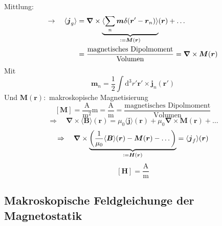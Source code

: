 \documentclass[titlepage,11pt,a4paper,ngerman]{report}
\newcommand*{\defeq}{\mathrel{\vcenter{\baselineskip0.5ex \lineskiplimit0pt \hbox{\scriptsize.}\hbox{\scriptsize.}}}=}
\newcommand{\tx}[1]{\textrm{#1}}
\newcommand{\ub}[1]{\underbrace{#1}}
\newcommand{\dd}{\tx{d}}
\renewcommand{\vec}[1]{\boldsymbol{#1}}
\newcommand{\vabla}{\boldsymbol{\nabla}}
\begin{document}
\\
Mittlung:
\begin{align*}
\rightarrow \quad \langle \vec{j}_g \rangle &= \vabla \times \ub{\langle \sum_n \vec{m} \delta(\vec{r}' - \vec{r}_n) \rangle}_{\defeq \vec{M}(\vec{r})} (\vec{r}) + \dots \\
&= \frac{\tx{magnetisches Dipolmoment}}{\tx{Volumen}} = \vabla \times \vec{M}(\vec{r})
\end{align*}
Mit
$$ \vec{m}_n = \frac{1}{2} \int \dd^3 r' \vec{r}' \times \vec{j}_n(\vec{r}') $$
Und $ \vec{M} (\vec{r}) : $ makroskopische Magnetisierung
\begin{equation*}
\left[\vec{M}\right] = \frac{\tx{A}}{\tx{m}^2} \tx{m} = \frac{\tx{A}}{\tx{m}} = \frac{\tx{magnetisches Dipolmoment}}{\tx{Volumen}}
\end{equation*}
\begin{equation*}
\Rightarrow \quad \vabla \times \langle \vec{B} \rangle (\vec{r}) = \mu_0 \langle \vec{j} \rangle (\vec{r}) + \mu_0 \vabla \times \vec{M}(\vec{r}) + \dots
\end{equation*}
\begin{equation*}
\Rightarrow \quad \vabla \times \ub{\left(\frac{1}{\mu_0} \langle \vec{B} \rangle (\vec{r})  - \vec{M} (\vec{r}) - \dots \right)}_{\defeq \vec{H}(\vec{r})} = \langle \vec{j}_f \rangle (\vec{r})
\end{equation*}
\begin{equation*}
\left[\vec{H}\right] = \frac{\tx{A}}{\tx{m}}
\end{equation*}

\subsection{Makroskopische Feldgleichunge der Magnetostatik}
\end{document}
